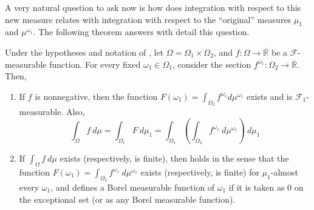 A very natural question to ask now is how does integration with respect to this new measure relates with integration with respect to the ``original'' measures \(\mu_1\) and \(\mu^{\omega_1}\). The following theorem answers with detail this question.

\begin{thrm}\label{theorem:two-dim Fubini's}
    Under the hypotheses and notation of , let \(\Omega=\Omega_1\times\Omega_2\), and \(f\colon \Omega\to\overline{\mathbb{R}}\) be a \(\mathcal{F}\)-measurable function. For every fixed \(\omega_1\in\Omega_1\), consider the section \(f^{\omega_1}\colon\Omega_2\to\overline{\mathbb{R}}\). Then,
    \begin{enumerate}
        \item If \(f\) is nonnegative, then the function \(F(\omega_1)=\int_{\Omega_2}f^{\omega_1}d\mu^{\omega_1}\) exists and is \(\mathcal{F}_1\)-measurable. Also,
            \begin{equation}\label{equation:two-dim Fubini's}
                \int_{\Omega}f~d\mu=\int_{\Omega_1}F~d\mu_1=\int_{\Omega_1}\left(\int_{\Omega_2}f^{\omega_1}~d\mu^{\omega_1}\right)~d\mu_1
            \end{equation}
        \item If \(\int_{\Omega}f~d\mu\) exists (respectively, is finite), then  holds in the sense that the function \(F(\omega_1)=\int_{\Omega_2}f^{\omega_1}~d\mu^{\omega_1}\) exists (respectively, is finite) for \(\mu_1\)-almost every \(\omega_1\), and defines a Borel measurable function of \(\omega_1\) if it is taken as \(0\) on the exceptional set (or as any Borel measurable function).
    \end{enumerate}
\end{thrm}
